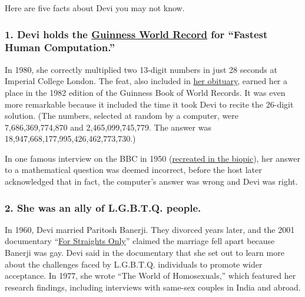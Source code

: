 Here are five facts about Devi you may not know.

\hypertarget{1-devi-holds-the-guinness-world-record-for-fastest-human-computation}{%
\subsubsection{\texorpdfstring{\textbf{1. Devi holds the}
\textbf{\href{https://www.guinnessworldrecords.com/world-records/67741-human-computation}{Guinness
World Record}} \textbf{for ``Fastest Human
Computation.''}}{1. Devi holds the Guinness World Record for ``Fastest Human Computation.''}}\label{1-devi-holds-the-guinness-world-record-for-fastest-human-computation}}

In 1980, she correctly multiplied two 13-digit numbers in just 28
seconds at Imperial College London. The feat, also included in
\href{https://www.nytimes.com/2013/04/24/world/asia/shakuntala-devi-human-computer-dies-in-india-at-83.html}{her
obituary}, earned her a place in the 1982 edition of the Guinness Book
of World Records. It was even more remarkable because it included the
time it took Devi to recite the 26-digit solution. (The numbers,
selected at random by a computer, were 7,686,369,774,870 and
2,465,099,745,779. The answer was 18,947,668,177,995,426,462,773,730.)

In one famous interview on the BBC in 1950
(\href{https://youtu.be/8q6ekdz30MA}{recreated in the biopic}), her
answer to a mathematical question was deemed incorrect, before the host
later acknowledged that in fact, the computer's answer was wrong and
Devi was right.

\hypertarget{2-she-was-an-ally-of-lgbtq-people}{%
\subsubsection{\texorpdfstring{\textbf{2. She was an ally of L.G.B.T.Q.
people.}}{2. She was an ally of L.G.B.T.Q. people.}}\label{2-she-was-an-ally-of-lgbtq-people}}

In 1960, Devi married Paritosh Banerji. They divorced years later, and
the 2001 documentary ``\href{https://youtu.be/jMvfkzgzK0c}{For Straights
Only}'' claimed the marriage fell apart because Banerji was gay. Devi
said in the documentary that she set out to learn more about the
challenges faced by L.G.B.T.Q. individuals to promote wider acceptance.
In 1977, she wrote ``The World of Homosexuals,'' which featured her
research findings, including interviews with same-sex couples in India
and abroad.

